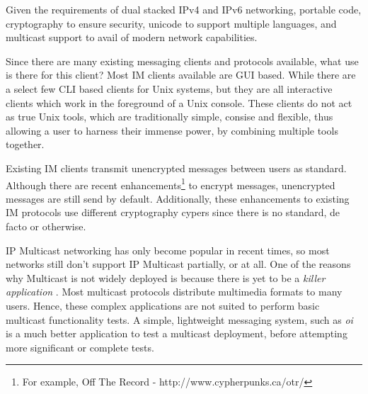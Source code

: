 
Given the requirements of dual stacked IPv4 and IPv6 networking,
portable code, cryptography to ensure security, unicode to support
multiple languages, and multicast support to avail of modern network
capabilities.


Since there are many existing messaging clients and protocols available,
what use is there for this client? Most IM clients available are GUI
based. While there are a select few CLI based clients for Unix systems,
but they are all interactive clients which work in the foreground of a
Unix console. These clients do not act as true Unix tools, which are
traditionally simple, consise and flexible, thus allowing a user to
harness their immense power, by combining multiple tools together.


Existing IM clients transmit unencrypted messages between users as
standard. Although there are 
recent enhancements\footnote{For example, Off The Record - http://www.cypherpunks.ca/otr/}
to encrypt messages, unencrypted messages are still send by default.
Additionally, these enhancements to existing IM protocols use different
cryptography cypers since there is no standard, de facto or otherwise.


IP Multicast networking has only become popular in recent times, so most
networks still don't support IP Multicast partially, or at all. One of
the reasons why Multicast is not widely deployed is because there is yet
to be a \emph{killer application} . Most multicast protocols distribute
multimedia formats to many users. Hence, these complex applications 
are not suited to perform basic multicast functionality tests. A simple,
lightweight messaging system, such as \emph{oi} is a much better  
application to test a multicast deployment, before attempting more
significant or complete tests.
